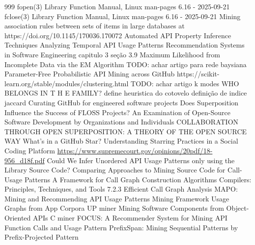 \begin{thebibliography}{999}
  fopen(3) Library Function Manual, Linux man-pages 6.16 - 2025-09-21 
  fclose(3) Library Function Manual, Linux man-pages 6.16 - 2025-09-21 
  Mining association rules between sets of items in large databases at https://doi.org/10.1145/170036.170072
  Automated API Property Inference Techniques
  Analyzing Temporal API Usage Patterns
  Recommendation Systems in Software Engineering capitulo 3 seção 3.9
  Maximum Likelihood from Incomplete Data via the EM Algorithm
  TODO: achar artigo para rede baysiana
  Parameter-Free Probabilistic API Mining across GitHub 
  https://scikit-learn.org/stable/modules/clustering.html
  TODO: achar artigo k modes 
  WHO BELONGS IN T H E FAMILY? define heuristica do cotovelo
  definição de indice jaccard
  Curating GitHub for engineered software projects
  Does Superposition Influence the Success of FLOSS Projects? An Examination of Open-Source Software Development by Organizations and Individuals
  COLLABORATION THROUGH OPEN SUPERPOSITION: A THEORY OF THE OPEN SOURCE WAY
  What’s in a GitHub Star? Understanding Starring Practices in a Social Coding Platform
  \url{https://www.supremecourt.gov/opinions/20pdf/18-956_d18f.pdf}
  Could We Infer Unordered API Usage Patterns only using the Library Source Code?
  Comparing Approaches to Mining Source Code for Call-Usage Patterns
  A Framework for Call Graph Construction Algorithms
  Compilers: Principles, Techniques, and Tools 7.2.3
  Efficient Call Graph Analysis
  MAPO: Mining and Recommending API Usage Patterns
  Mining Framework Usage Graphs from App Corpora
  UP miner
  Mining Software Components from Object-Oriented APIs
  C miner
  FOCUS: A Recommender System for Mining API Function Calls and Usage Pattern
  PrefixSpan: Mining Sequential Patterns by Prefix-Projected Pattern

\end{thebibliography}
